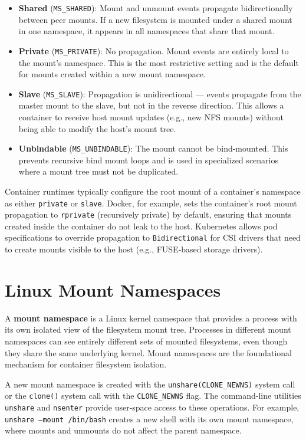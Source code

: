 \begin{itemize}
  \item \textbf{Shared} (\texttt{MS\_SHARED}): Mount and unmount events propagate bidirectionally between peer mounts. If a new filesystem is mounted under a shared mount in one namespace, it appears in all namespaces that share that mount.
  \item \textbf{Private} (\texttt{MS\_PRIVATE}): No propagation. Mount events are entirely local to the mount's namespace. This is the most restrictive setting and is the default for mounts created within a new mount namespace.
  \item \textbf{Slave} (\texttt{MS\_SLAVE}): Propagation is unidirectional --- events propagate from the master mount to the slave, but not in the reverse direction. This allows a container to receive host mount updates (e.g., new NFS mounts) without being able to modify the host's mount tree.
  \item \textbf{Unbindable} (\texttt{MS\_UNBINDABLE}): The mount cannot be bind-mounted. This prevents recursive bind mount loops and is used in specialized scenarios where a mount tree must not be duplicated.
\end{itemize}

Container runtimes typically configure the root mount of a container's namespace as either \texttt{private} or \texttt{slave}. Docker, for example, sets the container's root mount propagation to \texttt{rprivate} (recursively private) by default, ensuring that mounts created inside the container do not leak to the host. Kubernetes allows pod specifications to override propagation to \texttt{Bidirectional} for CSI drivers that need to create mounts visible to the host (e.g., FUSE-based storage drivers).

\section{Linux Mount Namespaces}

A \textbf{mount namespace} is a Linux kernel namespace that provides a process with its own isolated view of the filesystem mount tree. Processes in different mount namespaces can see entirely different sets of mounted filesystems, even though they share the same underlying kernel. Mount namespaces are the foundational mechanism for container filesystem isolation.

A new mount namespace is created with the \texttt{unshare(CLONE\_NEWNS)} system call or the \texttt{clone()} system call with the \texttt{CLONE\_NEWNS} flag. The command-line utilities \texttt{unshare} and \texttt{nsenter} provide user-space access to these operations. For example, \texttt{unshare --mount /bin/bash} creates a new shell with its own mount namespace, where mounts and unmounts do not affect the parent namespace.

